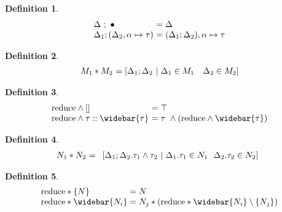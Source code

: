 \documentclass[manuscript]{acmart}
\theoremstyle{definition}
\newtheorem{definition}{Definition}[section]
\begin{document}



\begin{definition}
\[
  \begin{array}{l @{} l}
  \Delta\ ;\ \bullet
  &\ = \Delta 
  \\
  \Delta_1;(\Delta_2,\alpha \mapsto \tau) 
  &\ = (\Delta_1;\Delta_2),\alpha \mapsto \tau
  \end{array}
\]
\end{definition}

\begin{definition}
\[
  \begin{array}{l @{} l}
  M_1 * M_2 
  &\ = 
  [\Delta_1 ; \Delta_2 \ |\ 
    \Delta_1 \in M_1
    \ \ \  
    \Delta_2 \in M_2
  ]
  \end{array}
\]
\end{definition}

\begin{definition}
\[
  \begin{array}{l @{} l}
  \text{reduce} \wedge [] 
  &\ = \top
  \\
  \text{reduce} \wedge \tau::\widebar{\tau}
  &\ = \tau\ \wedge (\text{reduce} \wedge \widebar{\tau})
  \end{array}
\]
\end{definition}

\begin{definition}
\[
  \begin{array}{l @{} l}
    N_1 * N_2
    &\ = 
    \begin{array}[t]{l}
      [ \Delta_1 ; \Delta_2 . \tau_1 \wedge \tau_2 \ |\ 
        \Delta_1.\tau_1 \in N_1
        \ \ 
        \Delta_2.\tau_2 \in N_2
      ]
    \end{array}
  \end{array}
\]
\end{definition}

\begin{definition}
\[
  \begin{array}{l @{}l}
  \text{reduce} * \{N\}
  & {}= N
  \\
  \text{reduce} * \widebar{N_i}
  & {}= N_j * (\text{reduce} * \widebar{N_i}\setminus\{N_j\})
  \end{array}
\]
\end{definition}
\end{document}
